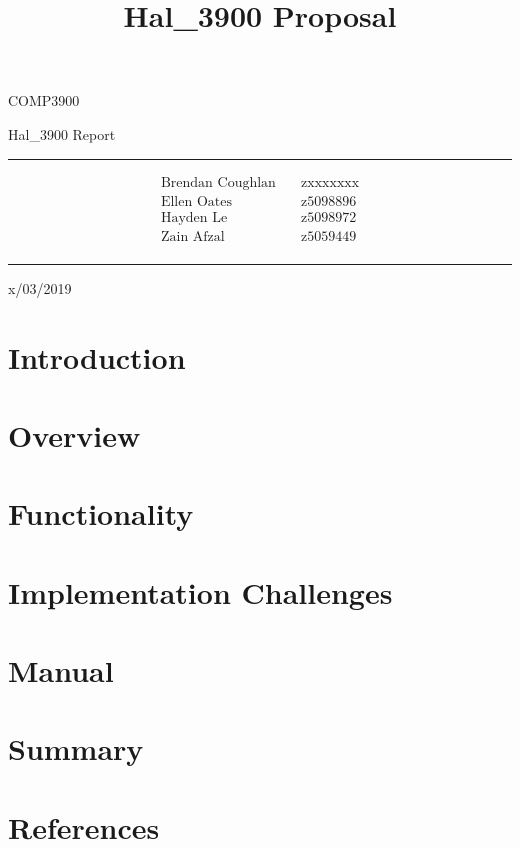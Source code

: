 \documentclass{article}
\title{Hal\_3900 Proposal}
\begin{document}
\begin{LARGE}
\begin{center}
\vspace*{15mm}

COMP3900

Hal\_3900 Report

\rule[4.5pt]{0.61\textwidth}{0.3pt}

\begin{align*}
  \text{Brendan Coughlan}   \quad   &\text{zxxxxxxx} \\
  \text{Ellen Oates}        \quad   &\text{z5098896} \\
  \text{Hayden Le}          \quad   &\text{z5098972} \\
  \text{Zain Afzal}         \quad   &\text{z5059449} \\
\end{align*}

\rule[4.5pt]{0.61\textwidth}{0.3pt}

x/03/2019

\end{center}
\end{LARGE}
\newpage


\section{Introduction}


\section{Overview}


\section{Functionality}


\section{Implementation Challenges}


\section{Manual}


\section{Summary}


\section{References}
\end{document}
